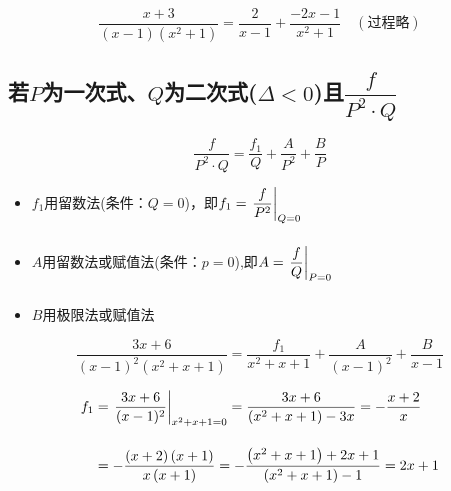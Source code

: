 
\vspace*{-15pt}

\begin{equation}\label{liushufa-12}
	\dfrac{x+3}{\left(x-1\right)\left(x^{2}+1\right)}=\dfrac{2}{x-1}+\dfrac{-2x-1}{x^{2}+1} \hspace{1em} (过程略)
\end{equation}

\subsection{若$P$为一次式、$Q$为二次式($\Delta<0$)且$\dfrac{f}{P^2\cdot Q}$}

\vspace{-10pt}

\[\dfrac{f}{P^{2}\cdot Q}=\dfrac{f_{1}}{Q}+\dfrac{A}{P^{2}}+\dfrac{B}{P}\]

\begin{itemize}
	\item $f_1$用留数法(条件：$Q=0$)，即$f_{1}=\left. \dfrac{f}{P^2} \right|_{\vphantom{\dfrac{1}{1}} Q=0}$
	\item $A$用留数法或赋值法(条件：$p=0$),即$A=\left. \dfrac{f}{Q} \right|_{\vphantom{\dfrac{1}{1}} P=0}$
	\item $B$用极限法或赋值法
\end{itemize}


\vspace*{-10pt}

\begin{equation}\label{liushufa-13}
	\dfrac{3x+6}{\left(x-1\right)^{2}\left(x^{2}+x+1\right)}=\dfrac{f_{1}}{x^{2}+x+1}+\dfrac{A}{\left(x-1\right)^{2}}+\dfrac{B}{x-1}
\end{equation}

\vspace{-30pt}

\begin{align*}
	f_{1}&=\left. \dfrac{3x+6}{(x-1)^2} \right|_{\vphantom{\dfrac{1}{1}} x^{2}+x+1=0} = \dfrac{3x+6}{(x^{2}+x+1)-3x} = -\dfrac{x+2}{x} \\[5pt]
	&=-\dfrac{\left(x+2\right)\left(x+1\right)}{x\left(x+1\right)}=-\dfrac{\left(x^{2}+x+1\right)+2x+1}{\left(x^{2}+x+1\right)-1}=2x+1
\end{align*}

\clearpage

\vspace*{-50pt}

